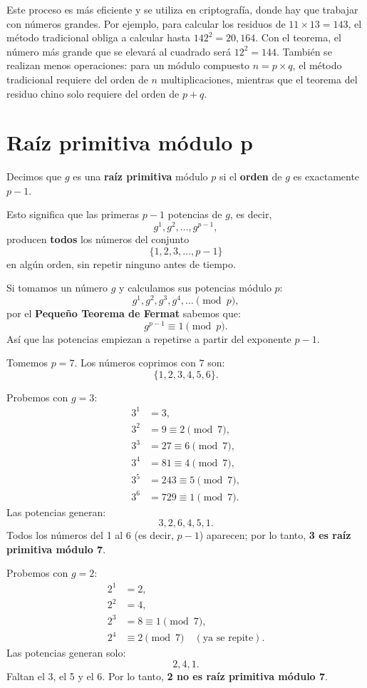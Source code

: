 Este proceso es más eficiente y se utiliza en criptografía, donde hay que trabajar con números grandes. Por ejemplo, para calcular los residuos de $11 \times 13 = 143$, el método tradicional obliga a calcular hasta $142^2 = 20{,}164$. Con el teorema, el número más grande que se elevará al cuadrado será $12^2 = 144$. También se realizan menos operaciones: para un módulo compuesto $n = p \times q$, el método tradicional requiere del orden de $n$ multiplicaciones, mientras que el teorema del residuo chino solo requiere del orden de $p + q$.

\section{Raíz primitiva módulo p}
\begin{definicion}
Decimos que $g$ es una \textbf{raíz primitiva} módulo $p$ si el \textbf{orden} de $g$ es exactamente $p-1$.
\end{definicion}

Esto significa que las primeras $p-1$ potencias de $g$, es decir,
\[
g^1, g^2, \dots, g^{p-1},
\]
producen \textbf{todos} los números del conjunto
\[
\{1, 2, 3, \dots, p-1\}
\]
en algún orden, sin repetir ninguno antes de tiempo.

Si tomamos un número $g$ y calculamos sus potencias módulo $p$:
\[
g^1, g^2, g^3, g^4, \dots \pmod{p},
\]
por el \textbf{Pequeño Teorema de Fermat} sabemos que:
\[
g^{p-1} \equiv 1 \pmod{p}.
\]
Así que las potencias empiezan a repetirse a partir del exponente $p-1$.

\begin{ejemplo}[Hallar una raíz primitiva para $p=7$]
\end{ejemplo}
\begin{solucion}
Tomemos $p = 7$. Los números coprimos con $7$ son:
\[
\{1,2,3,4,5,6\}.
\]

Probemos con $g = 3$:
\[
\begin{aligned}
3^1 &= 3, \\
3^2 &= 9 \equiv 2 \pmod{7}, \\
3^3 &= 27 \equiv 6 \pmod{7}, \\
3^4 &= 81 \equiv 4 \pmod{7}, \\
3^5 &= 243 \equiv 5 \pmod{7}, \\
3^6 &= 729 \equiv 1 \pmod{7}.
\end{aligned}
\]
Las potencias generan:
\[
3, 2, 6, 4, 5, 1.
\]
Todos los números del 1 al 6 (es decir, $p-1$) aparecen; por lo tanto, \textbf{3 es raíz primitiva módulo 7}.

Probemos con $g = 2$:
\[
\begin{aligned}
2^1 &= 2, \\
2^2 &= 4, \\
2^3 &= 8 \equiv 1 \pmod{7}, \\
2^4 &\equiv 2 \pmod{7} \quad (\text{ya se repite}).
\end{aligned}
\]
Las potencias generan solo:
\[
2, 4, 1.
\]
Faltan el 3, el 5 y el 6. Por lo tanto, \textbf{2 no es raíz primitiva módulo 7}.
\end{solucion}

